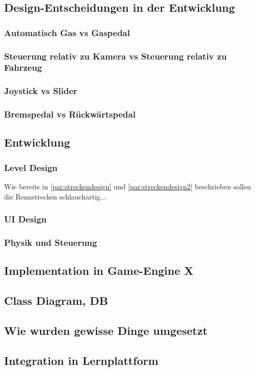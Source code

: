 \subsection{Design-Entscheidungen in der Entwicklung}
	\subsubsection{Automatisch Gas vs Gaspedal}
	\subsubsection{Steuerung relativ zu Kamera vs Steuerung relativ zu Fahrzeug}
	\subsubsection{Joystick vs Slider}
	\subsubsection{Bremspedal vs Rückwärtspedal}
\subsection{Entwicklung}
	\subsubsection{Level Design}
		Wie bereits in \ref{par:streckendesign} und \ref{par:streckendesign2} beschrieben sollen die Rennstrecken schlauchartig...
	\subsubsection{UI Design}
	\subsubsection{Physik und Steuerung}
	\subsubsection{}
\subsection{Implementation in Game-Engine X}
\subsection{Class Diagram, DB}
\subsection{Wie wurden gewisse Dinge umgesetzt}
\subsection{Integration in Lernplattform}
